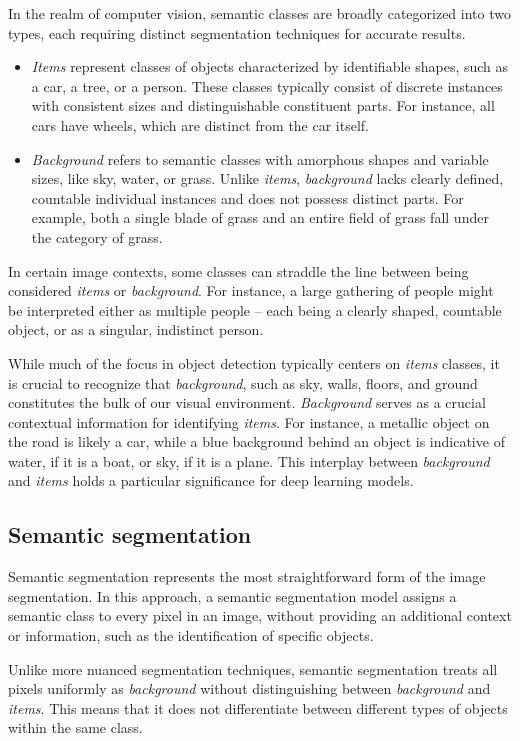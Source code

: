 In the realm of computer vision, semantic classes are broadly categorized into two types, each requiring distinct segmentation techniques for accurate results.
\begin{itemize}
  \item \textit{Items} represent classes of objects characterized by identifiable shapes, such as a car, a tree, or a
  person. These classes typically consist of discrete instances with consistent sizes and distinguishable constituent parts. For instance, all cars have wheels, which are distinct from the car itself.
  \item \textit{Background} refers to semantic classes with amorphous shapes and variable sizes, like sky, water, or grass. Unlike \textit{items}, \textit{background} lacks clearly defined, countable individual instances and does not possess distinct parts. For example, both a single blade of grass and an entire field of grass fall under the category of grass.
\end{itemize}
In certain image contexts, some classes can straddle the line between being considered \textit{items} or \textit{
  background}. For instance, a large gathering of people might be interpreted either as multiple people -- each being
a clearly shaped, countable object, or as a singular, indistinct person.

While much of the focus in object detection typically centers on \textit{items} classes, it is crucial to recognize that \textit{background}, such as sky, walls, floors, and ground constitutes the bulk of our visual environment. \textit{Background} serves as a crucial contextual information for identifying \textit{items}. For instance, a metallic object on the road is likely a car, while a blue background behind an object is indicative of water, if it is a boat, or sky, if it is a plane. This interplay between \textit{background} and \textit{items} holds a particular significance for deep learning models.

  \subsection{Semantic segmentation}
Semantic segmentation represents the most straightforward form of the image segmentation. In this approach, a semantic segmentation model assigns a semantic class to every pixel in an image, without providing an additional context or information, such as the identification of specific objects.

Unlike more nuanced segmentation techniques, semantic segmentation treats all pixels uniformly as \textit{background} without distinguishing between \textit{background} and \textit{items}. This means that it does not differentiate between different types of objects within the same class.

